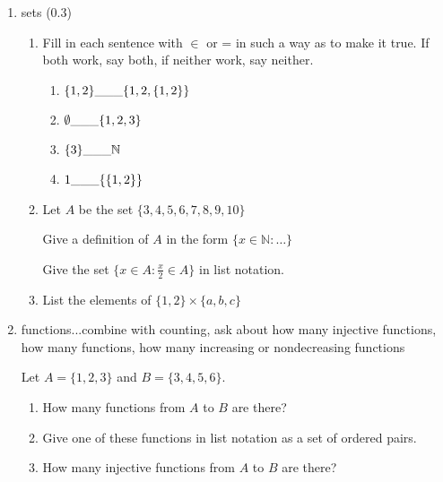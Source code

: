 \documentclass[12pt]{article}
\begin{document}
\begin{enumerate}

\item  sets (0.3)

\begin{enumerate}


\item  Fill in each sentence with $\in$ or = in such a way as to make it true.  If both work, say both, if neither work, say neither.

\begin{enumerate}

\item  $\{1,2\} {\tt \_\_\_} \{1,2,\{1,2\}\}$

\item  $\emptyset {\tt \_\_\_}  \{1,2,3\}$

\item  $\{3\}  {\tt \_\_\_}  \mathbb N$

\item  $1 {\tt \_\_\_}  \{\{1,2\}\}$

\end{enumerate}

\item  Let $A$ be the set $\{3,4,5,6,7,8,9,10\}$

Give a definition of $A$ in the form $\{x \in \mathbb N:\ldots\}$

Give the set $\{x \in A:\frac x2 \in A\}$ in list notation.

\item  List the elements of $\{1,2\} \times \{a,b,c\}$

\end{enumerate}

\newpage

\item  functions...combine with counting, ask about how many injective functions, how many functions, how many increasing or nondecreasing functions

Let $A = \{1,2,3\}$ and $B = \{3,4,5,6\}$.

\begin{enumerate}

\item How many functions from $A$ to $B$ are there?

\item Give one of these functions in list notation as a set of ordered pairs.

\item How many injective functions from $A$ to $B$ are there?


\end{enumerate}
\end{enumerate}
\end{document}
